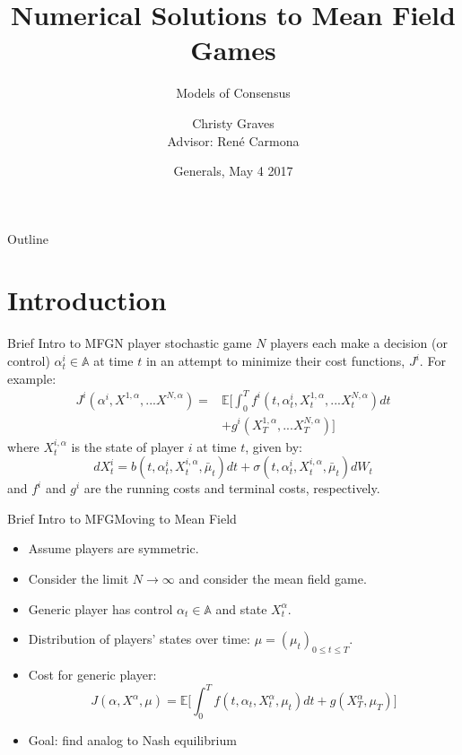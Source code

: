 \documentclass{beamer}
\title{Numerical Solutions to Mean Field Games}
\subtitle{Models of Consensus}
\author[Christy Graves]{Christy Graves\\{\small Advisor: Ren\'{e} Carmona}}
\institute[Princeton University] %
{
	Program in Applied and Computational Mathematics\\
	Princeton University
}
\date{Generals, May 4 2017}
\begin{document}
\begin{frame}
  \titlepage
\end{frame}

\begin{frame}{Outline}
  \tableofcontents
\end{frame}

\section{Introduction}
\begin{frame}{Brief Intro to MFG}{N player stochastic game}
		$N$ players each make a decision (or control) $\alpha_t^i \in \mathbb{A}$ at time $t$ in an attempt to minimize their cost functions, $J^i$. For example:
		\begin{equation}
		\begin{split}
		J^i(\alpha^i,X^{1,\alpha},...X^{N,\alpha})=&\mathbb{E}\Bigg[\int_{0}^{T}f^i(t,\alpha_t^i,X_t^{1,\alpha},...X_t^{N,\alpha})dt \\
		&+g^i(X_T^{1,\alpha},...X_T^{N,\alpha}) \Bigg]
		\end{split}
		\end{equation}
		where $X_t^{i,\alpha}$ is the state of player $i$ at time $t$, given by:
		\begin{equation}
		dX_t^i=b(t,\alpha_t^i,X_t^{i,\alpha},\bar{\mu}_t)dt+\sigma(t,\alpha_t^i,X_t^{i,\alpha},\bar{\mu}_t)dW_t
		\end{equation}
		and $f^i$ and $g^i$ are the running costs and terminal costs, respectively.
\end{frame}

	\begin{frame}{Brief Intro to MFG}{Moving to Mean Field}
		\begin{itemize}
			\item {
				Assume players are symmetric.
			}
			\item {
				Consider the limit $N \rightarrow \infty$ and consider the mean field game.
		    }
			\item {
				Generic player has control $\alpha_t \in \mathbb{A}$ and state $X_t^{\alpha}$.
			}
			\item {
				Distribution of players' states over time: $\mu=(\mu_t)_{0 \leq t \leq T}$.
			}
			\item {
				Cost for generic player:
				\begin{equation}
				J(\alpha,X^{\alpha},\mu)=\mathbb{E}\Bigg[\int_{0}^{T}f(t,\alpha_t,X_t^{\alpha},\mu_t)dt+g(X_T^{\alpha},\mu_T) \Bigg]
				\end{equation}
			}
			\pause
			\item {
				Goal: find analog to Nash equilibrium
			}
		\end{itemize}
	\end{frame}
\end{document}
